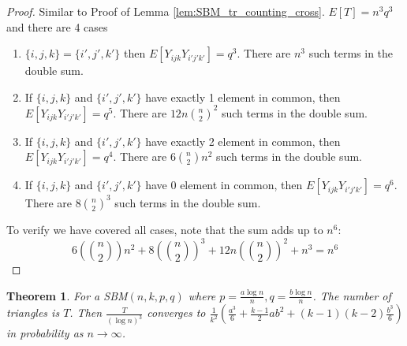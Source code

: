 \documentclass{ctexart}
\newtheorem{theorem}{Theorem}
\begin{document}
\begin{proof}
	Similar to Proof of Lemma \ref{lem:SBM_tr_counting_cross}.
	$E[T] = n^3 q^3$ and there are 4 cases
	\begin{enumerate}
	\item $\{i,j,k\} = \{i',j',k'\}$ then $E[Y_{ijk}Y_{i'j'k'}] = q^3$.
	There are $n^3$ such terms in the double sum.
	\item If $\{i,j,k\}$ and $\{i',j',k'\}$ have exactly 1 element in common, then $E[Y_{ijk}Y_{i'j'k'}] = q^5$.
	There are $12n\binom{n}{2}^2$ such terms in the double sum.
	\item If $\{i,j,k\}$ and $\{i',j',k'\}$ have exactly 2 element in common, then $E[Y_{ijk}Y_{i'j'k'}] = q^4$.
	There are $6\binom{n}{2}n^2$ such terms in the double sum.
	\item If $\{i,j,k\}$ and $\{i',j',k'\}$ have 0 element in common, then $E[Y_{ijk}Y_{i'j'k'}] = q^6$.
	There are $8\binom{n}{2}^3$ such terms in the double sum.		
\end{enumerate}	
To verify we have covered all cases, note that the sum adds up to $n^6$:
$$
6(\binom{n}{2})n^2  + 8(\binom{n}{2})^3 + 12n(\binom{n}{2})^2 +  n^3 = n^6
$$
\end{proof}
\begin{theorem}
	For a SBM$(n, k, p, q)$ where $p=\frac{a\log n}{n}, q = \frac{b\log n}{n}$. The number of triangles is $T$.
	Then $\frac{T}{(\log n)^3}$ converges to $\frac{1}{k^2}(\frac{a^3}{6} + \frac{k-1}{2}ab^2 + (k-1)(k-2)\frac{b^3}{6} )$ in probability as $n \to \infty$.
\end{theorem}
\end{document}
